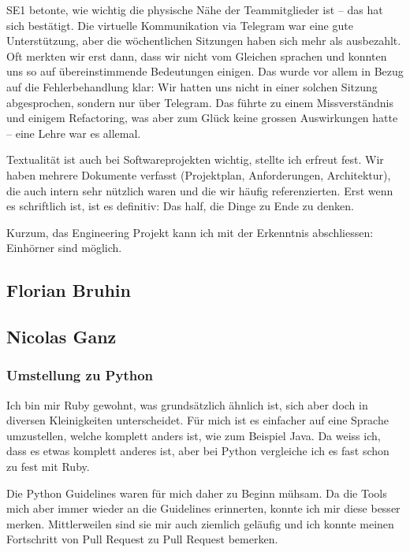 \documentclass[a4paper]{article}
\begin{document}
SE1 betonte, wie wichtig die physische Nähe der Teammitglieder ist -- das hat sich bestätigt. Die virtuelle Kommunikation via Telegram war eine gute Unterstützung, aber die wöchentlichen Sitzungen haben sich mehr als ausbezahlt. Oft merkten wir erst dann, dass wir nicht vom Gleichen sprachen und konnten uns so auf übereinstimmende Bedeutungen einigen. Das wurde vor allem in Bezug auf die Fehlerbehandlung klar: Wir hatten uns nicht in einer solchen Sitzung abgesprochen, sondern nur über Telegram. Das führte zu einem Missverständnis und einigem Refactoring, was aber zum Glück keine grossen Auswirkungen hatte -- eine Lehre war es allemal.

Textualität ist auch bei Softwareprojekten wichtig, stellte ich erfreut fest. Wir haben mehrere Dokumente verfasst (Projektplan, Anforderungen, Architektur), die auch intern sehr nützlich waren und die wir häufig referenzierten. Erst wenn es schriftlich ist, ist es definitiv: Das half, die Dinge zu Ende zu denken.

Kurzum, das Engineering Projekt kann ich mit der Erkenntnis abschliessen: Einhörner sind möglich.

  \subsection{Florian Bruhin}


  \subsection{Nicolas Ganz}

  \subsubsection{Umstellung zu Python}

  Ich bin mir Ruby gewohnt, was grundsätzlich ähnlich ist, sich aber doch in diversen Kleinigkeiten unterscheidet.
  Für mich ist es einfacher auf eine Sprache umzustellen, welche komplett anders ist, wie zum Beispiel Java.
  Da weiss ich, dass es etwas komplett anderes ist, aber bei Python vergleiche ich es fast schon zu fest mit Ruby.

  Die Python Guidelines waren für mich daher zu Beginn mühsam.
  Da die Tools mich aber immer wieder an die Guidelines erinnerten, konnte ich mir diese besser merken.
  Mittlerweilen sind sie mir auch ziemlich geläufig und ich konnte meinen Fortschritt von Pull Request zu Pull Request bemerken.
\end{document}
